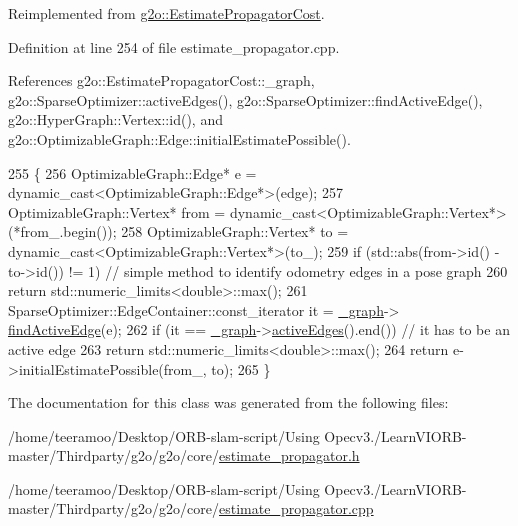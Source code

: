 Reimplemented from \hyperlink{classg2o_1_1EstimatePropagatorCost_abbff40e061153f9049a40514c44b4492}{g2o\+::\+Estimate\+Propagator\+Cost}.



Definition at line 254 of file estimate\+\_\+propagator.\+cpp.



References g2o\+::\+Estimate\+Propagator\+Cost\+::\+\_\+graph, g2o\+::\+Sparse\+Optimizer\+::active\+Edges(), g2o\+::\+Sparse\+Optimizer\+::find\+Active\+Edge(), g2o\+::\+Hyper\+Graph\+::\+Vertex\+::id(), and g2o\+::\+Optimizable\+Graph\+::\+Edge\+::initial\+Estimate\+Possible().


\begin{DoxyCode}
255   \{
256     OptimizableGraph::Edge* e = \textcolor{keyword}{dynamic\_cast<}OptimizableGraph::Edge*\textcolor{keyword}{>}(edge);
257     OptimizableGraph::Vertex* from = \textcolor{keyword}{dynamic\_cast<}OptimizableGraph::Vertex*\textcolor{keyword}{>}(*from\_.begin());
258     OptimizableGraph::Vertex* to = \textcolor{keyword}{dynamic\_cast<}OptimizableGraph::Vertex*\textcolor{keyword}{>}(to\_);
259     \textcolor{keywordflow}{if} (std::abs(from->id() - to->id()) != 1) \textcolor{comment}{// simple method to identify odometry edges in a pose graph}
260       \textcolor{keywordflow}{return} std::numeric\_limits<double>::max();
261     SparseOptimizer::EdgeContainer::const\_iterator it = \hyperlink{classg2o_1_1EstimatePropagatorCost_adf778ed8de5b54eb934e88107fe77980}{\_graph}->
      \hyperlink{classg2o_1_1SparseOptimizer_a68b59bf6d56a390717b82b3ae009ccf0}{findActiveEdge}(e);
262     \textcolor{keywordflow}{if} (it == \hyperlink{classg2o_1_1EstimatePropagatorCost_adf778ed8de5b54eb934e88107fe77980}{\_graph}->\hyperlink{classg2o_1_1SparseOptimizer_aef20b7dd401862d572a851349d1bc124}{activeEdges}().end()) \textcolor{comment}{// it has to be an active edge}
263       \textcolor{keywordflow}{return} std::numeric\_limits<double>::max();
264     \textcolor{keywordflow}{return} e->initialEstimatePossible(from\_, to);
265   \}
\end{DoxyCode}


The documentation for this class was generated from the following files\+:\begin{DoxyCompactItemize}
\item 
/home/teeramoo/\+Desktop/\+O\+R\+B-\/slam-\/script/\+Using Opecv3./\+Learn\+V\+I\+O\+R\+B-\/master/\+Thirdparty/g2o/g2o/core/\hyperlink{estimate__propagator_8h}{estimate\+\_\+propagator.\+h}\item 
/home/teeramoo/\+Desktop/\+O\+R\+B-\/slam-\/script/\+Using Opecv3./\+Learn\+V\+I\+O\+R\+B-\/master/\+Thirdparty/g2o/g2o/core/\hyperlink{estimate__propagator_8cpp}{estimate\+\_\+propagator.\+cpp}\end{DoxyCompactItemize}
